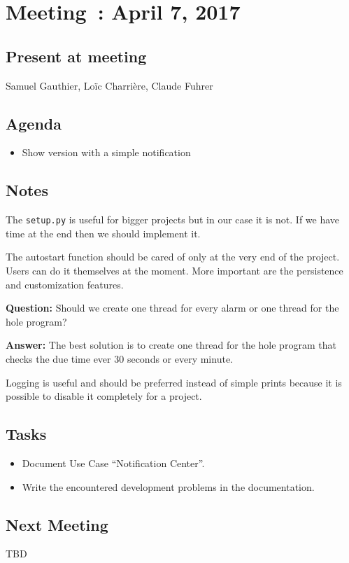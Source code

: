 \section{Meeting~: April 7, 2017}

\subsection*{Present at meeting}
Samuel Gauthier, Loïc Charrière, Claude Fuhrer

\subsection*{Agenda}
\begin{itemize}
    \item Show version with a simple notification
\end{itemize}

\subsection*{Notes}

The \texttt{setup.py} is useful for bigger projects but in our case it
is not. If we have time at the end then we should implement it.

The autostart function should be cared of only at the very end of the
project.  Users can do it themselves at the moment. More important are the
persistence and customization features.

\textbf{Question:} Should we create one thread for every alarm or one
thread for the hole program?

\textbf{Answer:} The best solution is to create one thread for the hole
program that checks the due time ever 30 seconds or every minute.

Logging is useful and should be preferred instead of simple prints
because it is possible to disable it completely for a project.

\subsection*{Tasks}
    \begin{itemize}
        \item Document Use Case ``Notification Center''.
        \item Write the encountered development problems in the documentation.
    \end{itemize}
\subsection*{Next Meeting}
TBD
